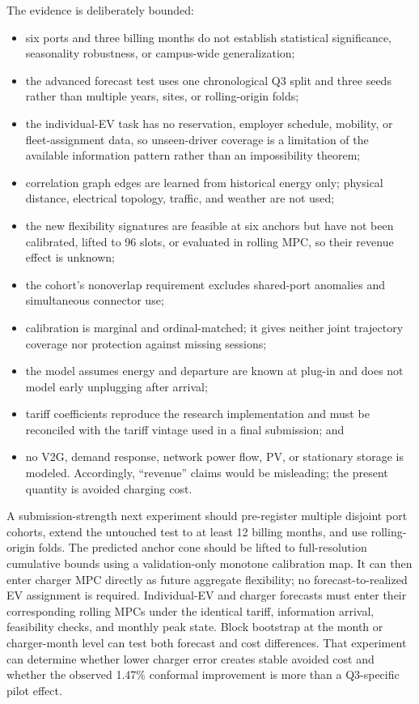 \documentclass[11pt]{article}
\begin{document}
The evidence is deliberately bounded:
\begin{itemize}
 \item six ports and three billing months do not establish statistical
significance, seasonality robustness, or campus-wide generalization;
 \item the advanced forecast test uses one chronological Q3 split and three
 seeds rather than multiple years, sites, or rolling-origin folds;
 \item the individual-EV task has no reservation, employer schedule, mobility,
 or fleet-assignment data, so unseen-driver coverage is a limitation of the
 available information pattern rather than an impossibility theorem;
 \item correlation graph edges are learned from historical energy only;
 physical distance, electrical topology, traffic, and weather are not used;
 \item the new flexibility signatures are feasible at six anchors but have not
 been calibrated, lifted to 96 slots, or evaluated in rolling MPC, so their
 revenue effect is unknown;
 \item the cohort's nonoverlap requirement excludes shared-port anomalies and
 simultaneous connector use;
 \item calibration is marginal and ordinal-matched; it gives neither joint
 trajectory coverage nor protection against missing sessions;
 \item the model assumes energy and departure are known at plug-in and does not
 model early unplugging after arrival;
 \item tariff coefficients reproduce the research implementation and must be
 reconciled with the tariff vintage used in a final submission; and
 \item no V2G, demand response, network power flow, PV, or stationary storage is
 modeled.  Accordingly, ``revenue'' claims would be misleading; the present
quantity is avoided charging cost.
\end{itemize}

A submission-strength next experiment should pre-register multiple disjoint
port cohorts, extend the untouched test to at least 12 billing months, and use
rolling-origin folds.  The predicted anchor cone should be lifted to
full-resolution cumulative bounds using a validation-only monotone calibration
map.  It can then enter charger MPC directly as future aggregate flexibility;
no forecast-to-realized EV assignment is required.  Individual-EV and charger
forecasts must enter their corresponding rolling MPCs under the identical
tariff, information arrival, feasibility checks, and monthly peak state.
Block bootstrap at the month or charger-month level can test both forecast and
cost differences.  That experiment can determine whether lower charger error
creates stable avoided cost and whether the observed 1.47\% conformal
improvement is more than a Q3-specific pilot effect.
\end{document}

